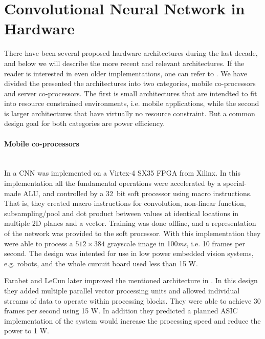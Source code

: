 \section{Convolutional Neural Network in Hardware} \label{sec_related_work_cnn}

There have been several proposed hardware architectures during the last decade, and below we will describe the more recent and relevant architectures. If the reader is interested in even older implementations, one can refer to \cite{Benkrid2002}  \cite{Cardells-Tormo2005} \cite{Hui2007} \cite{Savich2007} \cite{Girones2005}. We have divided the presented the architectures into two categories, mobile co-processors and server co-processors. The first is small architectures that are intendted to fit into resource constrained environments, i.e. mobile applications, while the second is larger architectures that have virtually no resource constraint. But a common design goal for both categories are power efficiency. 

\paragraph{Mobile co-processors} \hfil \\
In \cite{Farabet2009} a CNN was implemented on a Virtex-4 SX35 FPGA from Xilinx. In this implementation all the fundamental operations were accelerated by a special-made ALU, and controlled by a 32~bit soft processor using macro instructions. That is, they created macro instructions for convolution, non-linear function, subsampling/pool and dot product between values at identical locations in multiple 2D planes and a vector. Training was done offline, and a representation of the network was provided to the soft processor. With this implementation they were able to process a $ 512 \times 384 $ grayscale image in 100\textit{ms}, i.e. 10 frames per second. The design was intented for use in low power embedded vision  systems, e.g. robots, and the whole curcuit board used less than 15 W.

Farabet and LeCun later improved the mentioned architecture in \cite{Farabet2010}. In this design they added multiple parallel vector processing units and allowed individual
streams of data to operate within processing blocks. They were able to achieve 30 frames per second using 15 W. In addition they predicted a planned ASIC implementation of the system would increase the processing speed and reduce the power to 1 W. 

